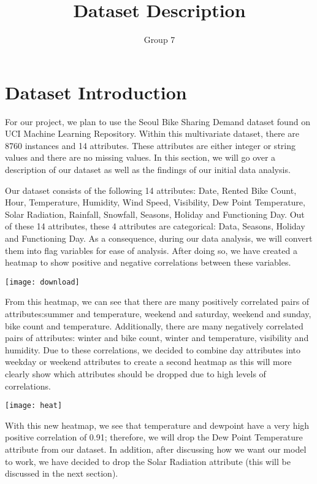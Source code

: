 \documentclass[main.tex]{subfiles}
\title{Dataset Description}
\author{Group 7 }
\begin{document}
\maketitle 

\section{Dataset Introduction}
For our project, we plan to use the Seoul Bike Sharing Demand dataset found on UCI Machine Learning Repository. Within this multivariate dataset, there are 8760 instances and 14 attributes. These attributes are either integer or string values and there are no missing values. In this section, we will go over a description of our dataset as well as the findings of our initial data analysis. 

Our dataset consists of the following 14 attributes: Date, Rented Bike Count, Hour, Temperature, Humidity, Wind Speed, Visibility, Dew Point Temperature, Solar Radiation, Rainfall, Snowfall, Seasons, Holiday and Functioning Day. Out of these 14 attributes, these 4 attributes are categorical: Data, Seasons, Holiday and Functioning Day. As a consequence, during our data analysis, we will convert them into flag variables for ease of analysis. After doing so, we have created a heatmap to show positive and negative correlations between these variables. 

\texttt{[image: download]}

From this heatmap, we can see that there are many positively correlated pairs of attributes:summer and temperature, weekend and saturday, weekend and sunday, bike count and temperature. Additionally, there are many negatively correlated pairs of attributes: winter and bike count, winter and temperature, visibility and humidity. Due to these correlations, we decided to combine day attributes into weekday or weekend attributes to create a second heatmap as this will more clearly show which attributes should be dropped due to high levels of correlations. 

\texttt{[image: heat]}

With this new heatmap, we see that temperature and dewpoint have a very high positive correlation of 0.91; therefore, we will drop the Dew Point Temperature attribute from our dataset. In addition, after discussing how we want our model to work, we have decided to drop the Solar Radiation attribute (this will be discussed in the next section). 
\end{document}
